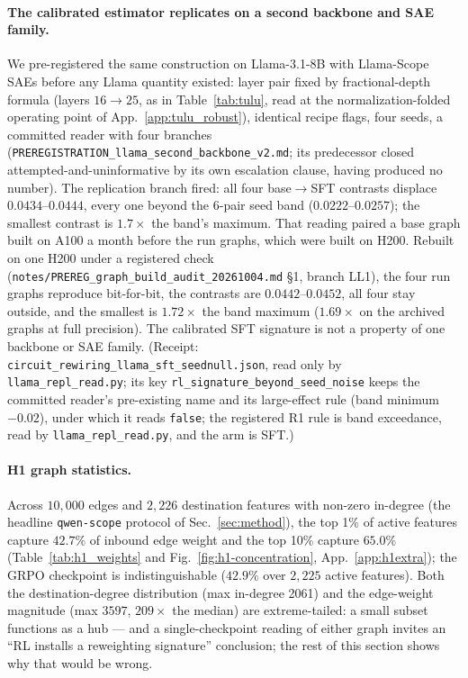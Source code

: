 \documentclass{article}
\begin{document}
\paragraph{The calibrated estimator replicates on a second backbone and SAE family.} We pre-registered the same construction on Llama-3.1-8B with Llama-Scope SAEs before any Llama quantity existed: layer pair fixed by fractional-depth formula (layers $16\to25$, as in Table~\ref{tab:tulu}, read at the normalization-folded operating point of App.~\ref{app:tulu_robust}), identical recipe flags, four seeds, a committed reader with four branches (\texttt{PREREGISTRATION\_llama\_second\_backbone\_v2.md}; its predecessor closed attempted-and-uninformative by its own escalation clause, having produced no number). The replication branch fired: all four base$\to$SFT contrasts displace $0.0434$--$0.0444$, every one beyond the $6$-pair seed band ($0.0222$--$0.0257$); the smallest contrast is $1.7\times$ the band's maximum. That reading paired a base graph built on A100 a month before the run graphs, which were built on H200. Rebuilt on one H200 under a registered check (\texttt{notes/PREREG\_graph\_build\_audit\_20261004.md} \S1, branch LL1), the four run graphs reproduce bit-for-bit, the contrasts are $0.0442$--$0.0452$, all four stay outside, and the smallest is $1.72\times$ the band maximum ($1.69\times$ on the archived graphs at full precision). The calibrated SFT signature is not a property of one backbone or SAE family. (Receipt: \texttt{circuit\_rewiring\_llama\_sft\_seednull.json}, read only by \texttt{llama\_repl\_read.py}; its key \texttt{rl\_signature\_beyond\_seed\_noise} keeps the committed reader's pre-existing name and its large-effect rule (band minimum $-0.02$), under which it reads \texttt{false}; the registered R1 rule is band exceedance, read by \texttt{llama\_repl\_read.py}, and the arm is SFT.)

\paragraph{H1 graph statistics.} Across $10{,}000$ edges and $2{,}226$ destination features with non-zero in-degree (the headline \texttt{qwen-scope} protocol of Sec.~\ref{sec:method}), the top 1\% of active features capture $42.7\%$ of inbound edge weight and the top 10\% capture $65.0\%$ (Table~\ref{tab:h1_weights} and Fig.~\ref{fig:h1-concentration}, App.~\ref{app:h1extra}); the GRPO checkpoint is indistinguishable ($42.9\%$ over $2{,}225$ active features). Both the destination-degree distribution (max in-degree 2061) and the edge-weight magnitude (max $3597$, $209\times$ the median) are extreme-tailed: a small subset functions as a hub --- and a single-checkpoint reading of either graph invites an ``RL installs a reweighting signature'' conclusion; the rest of this section shows why that would be wrong.
\end{document}
